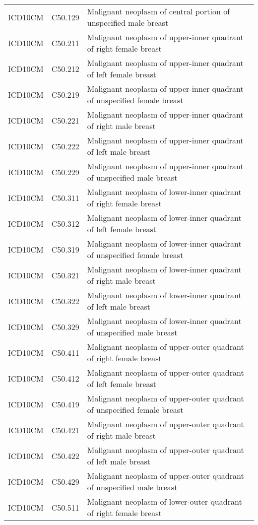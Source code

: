 \begin{longtable}{p{}p{}p{}}
  ICD10CM & C50.129 & Malignant neoplasm of central portion of unspecified male breast \\ 
  ICD10CM & C50.211 & Malignant neoplasm of upper-inner quadrant of right female breast \\ 
  ICD10CM & C50.212 & Malignant neoplasm of upper-inner quadrant of left female breast \\ 
  ICD10CM & C50.219 & Malignant neoplasm of upper-inner quadrant of unspecified female breast \\ 
  ICD10CM & C50.221 & Malignant neoplasm of upper-inner quadrant of right male breast \\ 
  ICD10CM & C50.222 & Malignant neoplasm of upper-inner quadrant of left male breast \\ 
  ICD10CM & C50.229 & Malignant neoplasm of upper-inner quadrant of unspecified male breast \\ 
  ICD10CM & C50.311 & Malignant neoplasm of lower-inner quadrant of right female breast \\ 
  ICD10CM & C50.312 & Malignant neoplasm of lower-inner quadrant of left female breast \\ 
  ICD10CM & C50.319 & Malignant neoplasm of lower-inner quadrant of unspecified female breast \\ 
  ICD10CM & C50.321 & Malignant neoplasm of lower-inner quadrant of right male breast \\ 
  ICD10CM & C50.322 & Malignant neoplasm of lower-inner quadrant of left male breast \\ 
  ICD10CM & C50.329 & Malignant neoplasm of lower-inner quadrant of unspecified male breast \\ 
  ICD10CM & C50.411 & Malignant neoplasm of upper-outer quadrant of right female breast \\ 
  ICD10CM & C50.412 & Malignant neoplasm of upper-outer quadrant of left female breast \\ 
  ICD10CM & C50.419 & Malignant neoplasm of upper-outer quadrant of unspecified female breast \\ 
  ICD10CM & C50.421 & Malignant neoplasm of upper-outer quadrant of right male breast \\ 
  ICD10CM & C50.422 & Malignant neoplasm of upper-outer quadrant of left male breast \\ 
  ICD10CM & C50.429 & Malignant neoplasm of upper-outer quadrant of unspecified male breast \\ 
  ICD10CM & C50.511 & Malignant neoplasm of lower-outer quadrant of right female breast \\ 

\end{longtable}
